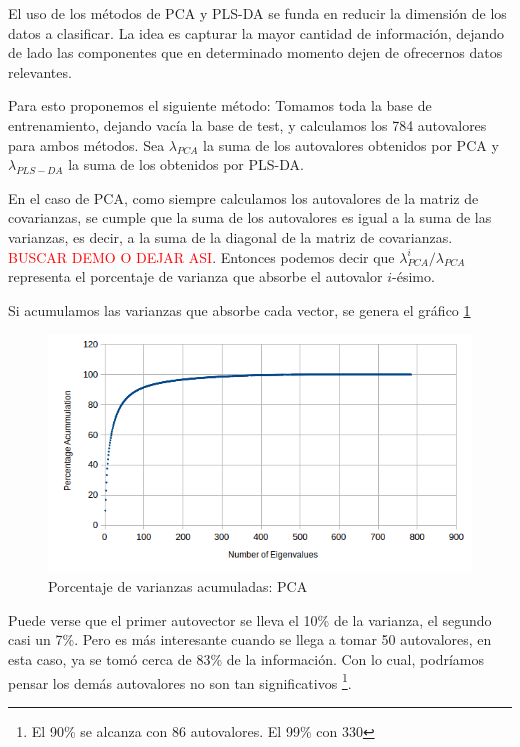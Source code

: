 El uso de los m\'etodos de PCA y PLS-DA se funda en reducir la dimensi\'on de los datos a clasificar. La idea es capturar la mayor cantidad de informaci\'on, dejando de lado las componentes que en determinado momento dejen de ofrecernos datos relevantes.

Para esto proponemos el siguiente m\'etodo: Tomamos toda la base de entrenamiento, dejando vac\'ia la base de test, y calculamos los 784 autovalores para ambos m\'etodos. Sea $\lambda_{PCA}$ la suma de los autovalores obtenidos por PCA y $\lambda_{PLS-DA}$ la suma de los obtenidos por PLS-DA.

En el caso de PCA, como siempre calculamos los autovalores de la matriz de covarianzas, se cumple que la suma de los autovalores es igual a la suma de las varianzas, es decir, a la suma de la diagonal de la matriz de covarianzas. \textcolor{red}{BUSCAR DEMO O DEJAR ASI}. Entonces podemos decir que $\lambda_{PCA}^{i} / \lambda_{PCA}$ representa el porcentaje de varianza que absorbe el autovalor $i$-\'esimo.

Si acumulamos las varianzas que absorbe cada vector, se genera el gr\'afico \ref{accum_var_PCA}

\begin{figure}[h!]
  \begin{center}
	\includegraphics[scale=1]{exp4/PCA-percentage.png}
	\caption{Porcentaje de varianzas acumuladas: PCA}
	\label{accum_var_PCA}
  \end{center}
\end{figure}

Puede verse que el primer autovector se lleva el 10\% de la varianza, el segundo casi un 7\%. Pero es m\'as interesante cuando se llega a tomar 50 autovalores, en esta caso, ya se tom\'o cerca de 83\% de la informaci\'on. Con lo cual, podr\'iamos pensar los dem\'as autovalores no son tan significativos \footnote{El 90\% se alcanza con 86 autovalores. El 99\% con 330}.

